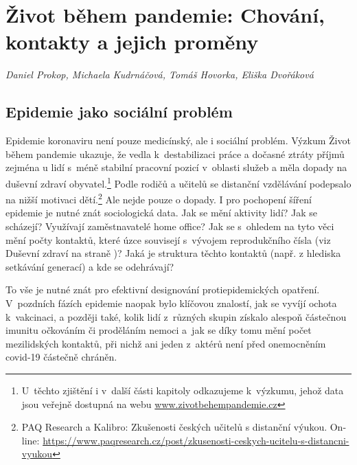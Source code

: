 \chapter[Život během pandemie: Chování a kontakty]{Život během pandemie: Chování, kontakty a jejich proměny}\label{Zmeny_chovani}

\textit{Daniel Prokop, Michaela Kudrnáčová, Tomáš Hovorka, Eliška Dvořáková}
\vspace{15mm}

\section*{Epidemie jako sociální problém}

Epidemie koronaviru není pouze medicínský, ale i sociální problém. Výzkum Život během pandemie ukazuje, že vedla k destabilizaci práce a dočasné ztráty příjmů zejména u lidí s méně stabilní pracovní pozicí v oblasti služeb a měla dopady na duševní zdraví obyvatel.\footnote{U těchto zjištění i v další části kapitoly odkazujeme k výzkumu, jehož data jsou veřejně dostupná na webu \url{www.zivotbehempandemie.cz}}  Podle rodičů a učitelů se distanční vzdělávání podepsalo na nižší motivaci dětí.\footnote{PAQ Research a Kalibro: Zkušenosti českých učitelů s distanční výukou. On-line: \url{https://www.paqresearch.cz/post/zkusenosti-ceskych-ucitelu-s-distancni-vyukou}} Ale nejde pouze o dopady. I pro pochopení šíření epidemie je nutné znát sociologická data. Jak se mění aktivity lidí? Jak se scházejí? Využívají zaměstnavatelé home office? Jak se s ohledem na tyto věci mění počty kontaktů, které úzce souvisejí s vývojem reprodukčního čísla (viz Duševní zdraví na straně \pageref{Dusevni_zdravi})? Jaká je struktura těchto kontaktů (např. z hlediska setkávání generací) a kde se odehrávají?

To vše je nutné znát pro efektivní designování protiepidemických opatření. V pozdních fázích epidemie naopak bylo klíčovou znalostí, jak se vyvíjí ochota k vakcinaci, a později také, kolik lidí z různých skupin získalo alespoň částečnou imunitu očkováním či proděláním nemoci a jak se díky tomu mění počet mezilidských kontaktů, při nichž ani jeden z aktérů není před onemocněním covid-19 částečně chráněn.

